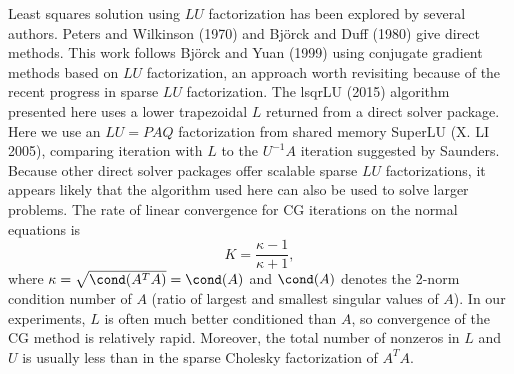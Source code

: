 \documentclass{report}
\begin{document}
Least squares solution using $LU$ factorization has been explored by
several authors. Peters and Wilkinson (1970) and Bj\"orck and Duff (1980)
give direct methods. This work follows Bj\"orck and Yuan (1999) using
conjugate gradient methods based on $LU$ factorization, an approach worth
revisiting because of the recent progress in sparse $LU$ factorization.
The lsqrLU (2015) algorithm presented here uses a lower trapezoidal $L$
returned from a direct solver package. Here we use an $LU = PAQ$
factorization from shared memory SuperLU (X. LI 2005), comparing
iteration with $L$ to the $U^{-1}A$ iteration suggested by Saunders.
Because other direct solver packages offer scalable sparse $LU$
factorizations, it appears likely that the algorithm used here can also
be used to solve larger problems.
The rate of linear convergence for CG iterations on the normal equations is
$$K = \frac {\kappa - 1 }{\kappa + 1},$$
where $\kappa=\sqrt{\cond(A^TA)}=\cond(A)$ and $\cond(A)$ denotes the
2-norm condition number of $A$ (ratio of largest and smallest singular
values of $A$).
In our experiments, $L$ is often much better conditioned than $A$, so
convergence of the CG method is relatively rapid. Moreover, the total
number of nonzeros
in $L$ and $U$ is usually less than in the sparse Cholesky factorization of
$A^T A$.
\end{document}
